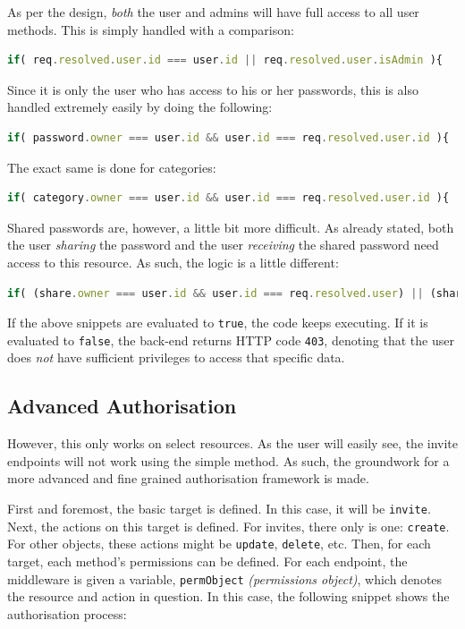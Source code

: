 			As per the design, \emph{both} the user and admins will have full access to all user methods. This is simply handled with a comparison:
			\begin{lstlisting}[gobble=16,language=JavaScript]
                if( req.resolved.user.id === user.id || req.resolved.user.isAdmin ){
			\end{lstlisting}

			Since it is only the user who has access to his or her passwords, this is also handled extremely easily by doing the following:
			\begin{lstlisting}[gobble=16,language=JavaScript]
                if( password.owner === user.id && user.id === req.resolved.user.id ){
			\end{lstlisting}
			The exact same is done for categories:
			\begin{lstlisting}[gobble=16,language=JavaScript]
                if( category.owner === user.id && user.id === req.resolved.user.id ){
			\end{lstlisting}

			Shared passwords are, however, a little bit more difficult. As already stated, both the user \emph{sharing} the password and the user \emph{receiving} the shared password need access to this resource. As such, the logic is a little different:
			\begin{lstlisting}[gobble=16,language=JavaScript]
                if( (share.owner === user.id && user.id === req.resolved.user) || (share.origin_owner === user.id && user.id === req.resolved.user)){
			\end{lstlisting}
		
			If the above snippets are evaluated to \verb=true=, the code keeps executing. If it is evaluated to \verb=false=, the back-end returns HTTP code \verb=403=, denoting that the user does \emph{not} have sufficient privileges to access that specific data.

		\subsection{Advanced Authorisation}
			However, this only works on select resources. As the user will easily see, the invite endpoints will not work using the simple method. As such, the groundwork for a more advanced and fine grained authorisation framework is made.

			First and foremost, the basic target is defined. In this case, it will be \verb=invite=. Next, the actions on this target is defined. For invites, there only is one: \verb=create=. For other objects, these actions might be \verb=update=, \verb=delete=, etc. Then, for each target, each method's permissions can be defined. For each endpoint, the middleware is given a variable, \verb=permObject= \emph{(permissions object)}, which denotes the resource and action in question. In this case, the following snippet shows the authorisation process:

